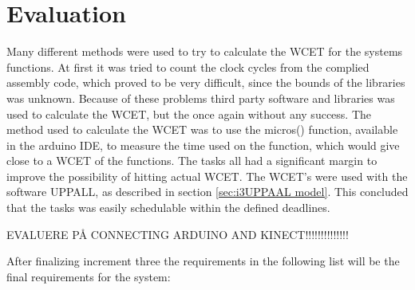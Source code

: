 \section{Evaluation}
\label{sec:i3Evaluation}
Many different methods were used to try to calculate the WCET for the systems functions. At first it was tried to count the clock cycles from the complied assembly code, which proved to be very difficult, since the bounds of the libraries was unknown. Because of these problems third party software and libraries was used to calculate the WCET, but the once again without any success. The method used to calculate the WCET was to use the micros() function, available in the arduino IDE, to measure the time used on the function, which would give close to a WCET of the functions. The tasks all had a significant margin to improve the possibility of hitting actual WCET. \newline
The WCET's were used with the software UPPALL, as described in section \ref{sec:i3UPPAAL model}. This concluded that the tasks was easily schedulable within the defined deadlines.

EVALUERE PÅ CONNECTING ARDUINO AND KINECT!!!!!!!!!!!!!!

After finalizing increment three the requirements in the following list will be the final requirements for the system:

